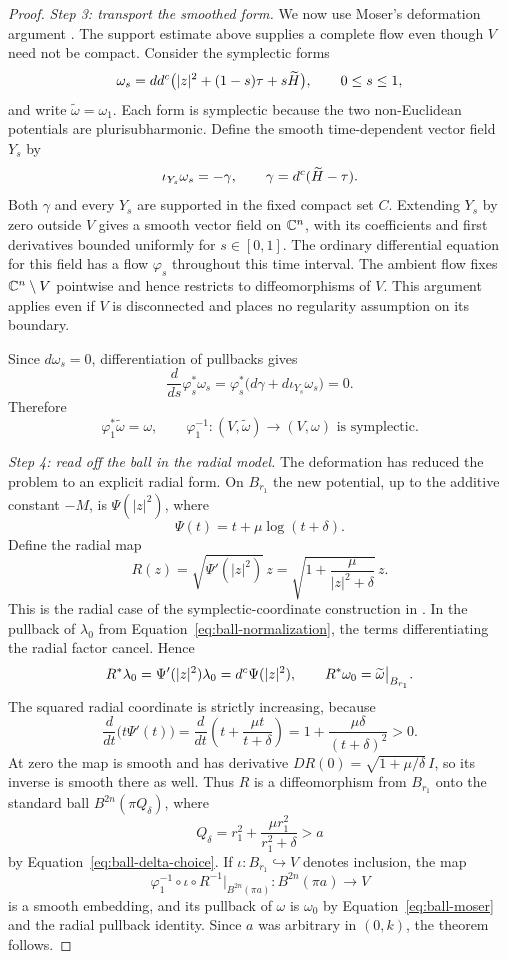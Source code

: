 \begin{proof}
\medskip
\noindent\textit{Step 3: transport the smoothed form.}
We now use Moser's deformation argument \cite[Section~4]{Moser1965}.
The support estimate above supplies a complete flow even though $V$
need not be compact. Consider the symplectic forms
\[
 \omega_s=dd^c\bigl(|z|^2+(1-s)\tau+s\widetilde H\bigr),
 \qquad 0\le s\le1,
\]
and write $\widetilde\omega=\omega_1$.  Each form is symplectic because
the two non-Euclidean potentials are plurisubharmonic.  Define the
smooth time-dependent vector field $Y_s$ by
\[
 \iota_{Y_s}\omega_s=-\gamma,
 \qquad \gamma=d^c(\widetilde H-\tau).
\]
Both $\gamma$ and every $Y_s$ are supported in the fixed compact set
$C$.  Extending $Y_s$ by zero outside $V$ gives a smooth vector field
on $\mathbb C^n$, with its coefficients and first derivatives bounded
uniformly for $s\in[0,1]$.  The ordinary differential equation for
this field has a flow $\varphi_s$ throughout this time interval.
The ambient flow fixes $\mathbb C^n\setminus V$ pointwise and hence restricts
to diffeomorphisms of $V$.  This argument applies even if $V$ is
disconnected and places no regularity assumption on its boundary.

Since $d\omega_s=0$, differentiation of pullbacks gives
\[
 \frac{d}{ds}\varphi_s^*\omega_s
 =\varphi_s^*\bigl(d\gamma+d\iota_{Y_s}\omega_s\bigr)=0.
\]
Therefore
\begin{equation}
 \varphi_1^*\widetilde\omega=\omega,
 \qquad
 \varphi_1^{-1}:(V,\widetilde\omega)\longrightarrow(V,\omega)
 \text{ is symplectic}.
 \label{eq:ball-moser}
\end{equation}

\medskip
\noindent\textit{Step 4: read off the ball in the radial model.}
The deformation has reduced the problem to an explicit radial form.
On $B_{r_1}$ the new potential, up to the additive constant $-M$, is
$\Psi(|z|^2)$, where
\[
 \Psi(t)=t+\mu\log(t+\delta).
\]
Define the radial map
\[
 R(z)=\sqrt{\Psi'(|z|^2)}\,z
     =\sqrt{1+\frac\mu{|z|^2+\delta}}\,z.
\]
This is the radial case of the symplectic-coordinate construction in
\cite[proof of Theorem~1.1, Equation~(23)]{LoiZuddas2008}.
In the pullback of $\lambda_0$ from
Equation~\eqref{eq:ball-normalization}, the terms differentiating the
radial factor cancel.  Hence
\[
 R^*\lambda_0=\Psi'(|z|^2)\lambda_0=d^c\Psi(|z|^2),
 \qquad R^*\omega_0=\widetilde\omega\big|_{B_{r_1}}.
\]
The squared radial coordinate is strictly increasing, because
\[
 \frac{d}{dt}\bigl(t\Psi'(t)\bigr)
 =\frac{d}{dt}\left(t+\frac{\mu t}{t+\delta}\right)
 =1+\frac{\mu\delta}{(t+\delta)^2}>0.
\]
At zero the map is smooth and has derivative
$DR(0)=\sqrt{1+\mu/\delta}\,I$, so its inverse is smooth there as
well.  Thus $R$ is a diffeomorphism from $B_{r_1}$ onto the standard
ball $B^{2n}(\pi Q_\delta)$, where
\[
 Q_\delta=r_1^2+\frac{\mu r_1^2}{r_1^2+\delta}>a
\]
by Equation~\eqref{eq:ball-delta-choice}.  If
$\iota:B_{r_1}\hookrightarrow V$ denotes inclusion, the map
\[
 \varphi_1^{-1}\circ\iota\circ
       R^{-1}\big|_{B^{2n}(\pi a)}:
 B^{2n}(\pi a)\longrightarrow V
\]
is a smooth embedding, and its pullback of $\omega$ is $\omega_0$ by
Equation~\eqref{eq:ball-moser} and the radial pullback identity.
Since $a$ was arbitrary in $(0,k)$, the theorem follows.
\end{proof}
